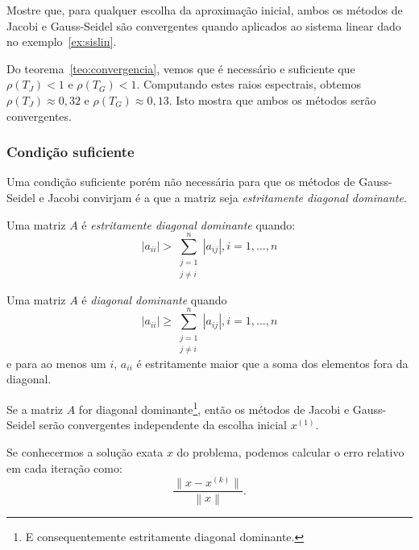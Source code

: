 \begin{ex}
  Mostre que, para qualquer escolha da aproximação inicial, ambos os métodos de Jacobi e Gauss-Seidel são convergentes quando aplicados ao sistema linear dado no exemplo~\ref{ex:sislin}.
\end{ex}
\begin{sol}
  Do teorema~\ref{teo:convergencia}, vemos que é necessário e suficiente que $\rho(T_J) < 1$ e $\rho(T_G) < 1$. Computando estes raios espectrais, obtemos $\rho(T_J) \approx 0,32$ e $\rho(T_G) \approx 0,13$. Isto mostra que ambos os métodos serão convergentes. 
\end{sol}

\subsubsection{Condição suficiente}

Uma condição suficiente porém não necessária para que os métodos de Gauss-Seidel e Jacobi convirjam é a que a matriz seja \emph{estritamente diagonal dominante}.

\begin{defn}
 Uma matriz $A$ é \emph{estritamente diagonal dominante} quando:
\begin{equation*}
  \left |a_{ii}\right |> \sum_{\substack{j=1\\j\ne i}}^{n} \left |a_{ij}\right |, i=1,...,n
\end{equation*}
\end{defn}

\begin{defn}
 Uma matriz $A$ é \emph{diagonal dominante} quando
\begin{equation*}
  \left |a_{ii}\right | \geq \sum_{\substack{j=1\\j\ne i}}^{n} \left |a_{ij}\right |, i=1,...,n
\end{equation*}
e para ao menos um $i$, $a_{ii}$ é estritamente maior que a soma dos elementos fora da diagonal.
\end{defn}

\begin{teo}
 Se a matriz $A$ for diagonal dominante\footnote{E consequentemente estritamente diagonal dominante.}, então os métodos de Jacobi e Gauss-Seidel serão convergentes independente da escolha inicial $x^{(1)}$.
\end{teo}

Se conhecermos a solução exata $x$ do problema, podemos calcular o erro relativo em cada iteração como:
\begin{equation*}
   \frac{ \|x-x^{(k)}\|}{\left\|x\right\|}.
\end{equation*}

